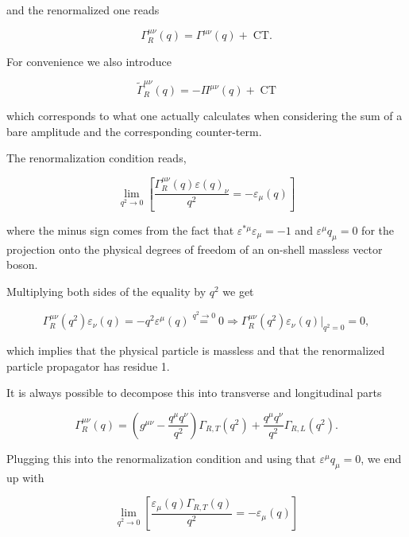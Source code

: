 \documentclass[../FeynCalcManual.tex]{subfiles}
\begin{document}
and the renormalized one reads

\begin{equation}
    \Gamma_R^{\mu \nu} (q) = \Gamma^{\mu \nu} (q) + \;\text{CT}.
\end{equation}

For convenience we also introduce

\begin{equation}
    \tilde{\Gamma}^{\mu \nu}_R(q) = - \Pi^{\mu \nu} (q) + \;\text{CT}
\end{equation}

which corresponds to what one actually calculates when considering the
sum of a bare amplitude and the corresponding counter-term.

The renormalization condition reads,

\begin{equation}
\lim_{q^2 \to 0} \left [ \frac{\Gamma_R^{\mu \nu} (q) \varepsilon(q)_\nu}{q^2}  = - \varepsilon_{\mu}(q) \right ]
\end{equation}

where the minus sign comes from the fact that
\(\varepsilon^{\ast \mu} \varepsilon_\mu = -1\) and
\(\varepsilon^\mu q_\mu =0\) for the projection onto the physical
degrees of freedom of an on-shell massless vector boson.

Multiplying both sides of the equality by \(q^2\) we get

\begin{equation}
\Gamma_R^{\mu \nu} (q^2)   \varepsilon_\nu (q) = - q^2 \varepsilon^{\mu}(q) \overset{q^2 \to 0}{=} 0 \Rightarrow \Gamma_R^{\mu \nu} (q^2) \varepsilon_\nu (q) \biggl|_{q^2=0}  = 0,
\end{equation}

which implies that the physical particle is massless and that the
renormalized particle propagator has residue 1.

It is always possible to decompose this into transverse and longitudinal
parts

\begin{equation}
\Gamma_R^{\mu \nu} (q) = \left ( g^{\mu \nu} - \frac{q^\mu q^\nu}{q^2} \right ) \Gamma_{R,T} (q^2) + \frac{q^\mu q^\nu}{q^2} \Gamma_{R,L} (q^2).
\end{equation}

Plugging this into the renormalization condition and using that
\(\varepsilon^\mu q_\mu = 0\), we end up with

\begin{equation}
        \lim_{q^2 \to 0} \left [ \frac{\varepsilon_{\mu}(q) \Gamma_{R,T} (q)}{q^2}  = - \varepsilon_{\mu}(q) \right ]
\end{equation}
\end{document}
